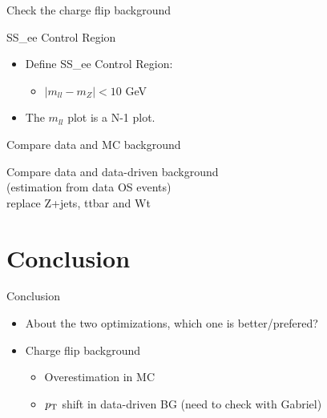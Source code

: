 \documentclass[mathserif,serif]{beamer}
\begin{document}
\begin{frame}
\begin{center}
\huge
Check the charge flip background
\end{center}
\end{frame}

\begin{frame}{SS\_ee Control Region}
\begin{itemize}
\item Define SS\_ee Control Region:
\begin{itemize}
\item $|m_{ll}-m_Z| < 10$ GeV
\end{itemize}
\item The $m_{ll}$ plot is a N-1 plot.
\end{itemize}
\end{frame}

\begin{frame}
\begin{center}
\huge
Compare data and MC background
\end{center}
\end{frame}

%
%

\begin{frame}
\begin{center}
\huge
Compare data and data-driven background \\
\normalsize
(estimation from data OS events) \\
replace Z+jets, ttbar and Wt
\end{center}
\end{frame}

%
%

\section{Conclusion}
\begin{frame}{Conclusion}
\begin{itemize}
\item About the two optimizations, which one is better/prefered?
\item Charge flip background
\begin{itemize}
\item Overestimation in MC
\item $p_{\text{T}}$ shift in data-driven BG (need to check with Gabriel)
\end{itemize}
\end{itemize}
\end{frame}
\end{document}
